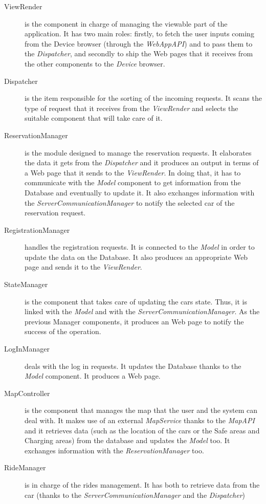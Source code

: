 \documentclass[11pt,a4paper]{report}
\begin{document}
\begin{description}
\item[ViewRender]is the component in charge of managing the viewable part of the application. It has two main roles: firstly, to fetch the user inputs coming from the Device browser (through the \textit{WebAppAPI}) and to pass them to the \textit{Dispatcher}, and secondly to ship the Web pages that it receives from the other components to the \textit{Device} browser.
\item[Dispatcher] is the item responsible for the sorting of the incoming requests. It scans the type of request that it receives from the \textit{ViewRender} and selects the suitable component that will take care of it.
\item[ReservationManager] is the module designed to manage the reservation requests. It elaborates the data it gets from the \textit{Dispatcher} and it produces an output in terms of a Web page that it sends to the \textit{ViewRender}. In doing that, it has to communicate with the \textit{Model} component to get information from the Database and eventually to update it. It also exchanges information with the \textit{ServerCommunicationManager} to notify the selected car of the reservation request.
\item[RegistrationManager] handles the registration requests. It is connected to the \textit{Model} in order to update the data on the Database. It also produces an appropriate Web page and sends it to the \textit{ViewRender}.
\item[StateManager] is the component that takes care of updating the cars state. Thus, it is linked with the \textit{Model} and with the \textit{ServerCommunicationManager}.
As the previous Manager components, it produces an Web page to notify the success of the operation.
\item[LogInManager] deals with the log in requests. It updates the Database thanks to the \textit{Model} component. It produces a Web page. \item[MapController] is the component that manages the map that the user and the system can deal with. It makes use of an external \textit{MapService} thanks to the \textit{MapAPI} and it retrieves data (such as the location of the cars or the Safe areas and Charging areas) from the database and updates the \textit{Model} too. It exchanges information with the \textit{ReservationManager} too.
\item[RideManager] is in charge of the rides management. It has both to retrieve data from the car (thanks to the \textit{ServerCommunicationManager} and the \textit{Dispatcher})

\end{description}
\end{document}

